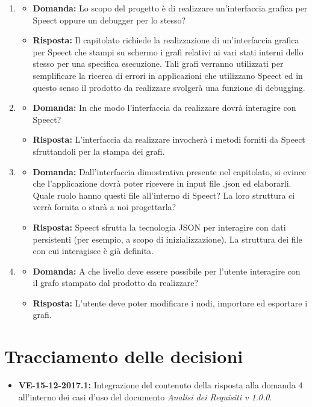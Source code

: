\documentclass[openany,12pt,a4paper]{article}
\begin{document}
	\begin{enumerate}
	
	\item
    	\begin{itemize}
    	    \item \textbf{Domanda:} Lo scopo del progetto è di realizzare un’interfaccia grafica per Speect oppure un debugger per lo stesso?
    	    \item \textbf{Risposta:} Il capitolato richiede la realizzazione di un'interfaccia grafica per Speect che stampi su schermo i grafi relativi ai vari stati interni dello stesso per una specifica esecuzione. Tali grafi verranno utilizzati per semplificare la ricerca di errori in applicazioni che utilizzano Speect ed in questo senso il prodotto da realizzare svolgerà una funzione di debugging. 
    	\end{itemize}
    \item
    	\begin{itemize}
    	    \item \textbf{Domanda:} In che modo l'interfaccia da realizzare dovrà interagire con Speect?
    	    \item \textbf{Risposta:} L'interfaccia da realizzare invocherà i metodi forniti da Speect sfruttandoli per la stampa dei grafi.
    	\end{itemize}
    \item
    	\begin{itemize}
    	    \item \textbf{Domanda:} Dall'interfaccia dimostrativa presente nel capitolato, si evince che l'applicazione dovrà poter ricevere in input file .json ed elaborarli. Quale ruolo hanno questi file all'interno di Speect? La loro struttura ci verrà fornita o starà a noi progettarla?
    	    \item \textbf{Risposta:} Speect sfrutta la tecnologia JSON per interagire con dati persistenti (per esempio, a scopo di inizializzazione). La struttura dei file con cui interagisce è già definita.
    	\end{itemize}
    \item
    	\begin{itemize}
    	    \item \textbf{Domanda:} A che livello deve essere possibile per l'utente interagire con il grafo stampato dal prodotto da realizzare?
    	    \item \textbf{Risposta:} L'utente deve poter modificare i nodi, importare ed esportare i grafi.
    	\end{itemize}
	
	\end{enumerate}
	
	\section{Tracciamento delle decisioni}
	
	\begin{itemize}
	    \item \textbf{VE-15-12-2017.1:} Integrazione del contenuto della risposta alla domanda 4 all'interno dei casi d'uso del documento \textit{Analisi dei Requisiti v 1.0.0}.
	\end{itemize}
	
	
\end{document}
